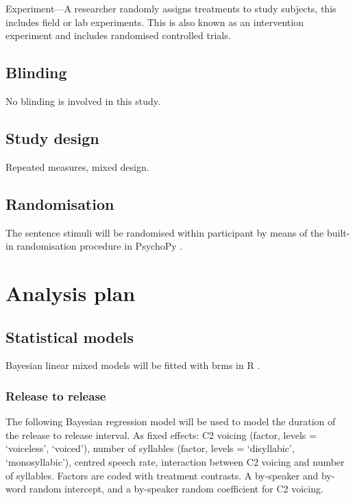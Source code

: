 \documentclass[11pt,]{article}
\begin{document}
Experiment---A researcher randomly assigns treatments to study subjects,
this includes field or lab experiments. This is also known as an
intervention experiment and includes randomised controlled trials.

\hypertarget{blinding}{%
\subsection{Blinding}\label{blinding}}

No blinding is involved in this study.

\hypertarget{study-design}{%
\subsection{Study design}\label{study-design}}

Repeated measures, mixed design.

\hypertarget{randomisation}{%
\subsection{Randomisation}\label{randomisation}}

The sentence stimuli will be randomised within participant by means of
the built-in randomisation procedure in PsychoPy \citep{peirce2009}.

\hypertarget{analysis-plan}{%
\section{Analysis plan}\label{analysis-plan}}

\hypertarget{statistical-models}{%
\subsection{Statistical models}\label{statistical-models}}

\label{s:stats}

Bayesian linear mixed models
\citep{vasishth2018, mcelreath2015, kruschke2015} will be fitted with
brms \citep{burkner2017, burkner2018} in R \citep{r-core-team2018}.

\hypertarget{release-to-release}{%
\subsubsection{Release to release}\label{release-to-release}}

The following Bayesian regression model will be used to model the
duration of the release to release interval. As fixed effects: C2
voicing (factor, levels = `voiceless', `voiced'), number of syllables
(factor, levels = `disyllabic', `monosyllabic'), centred speech rate,
interaction between C2 voicing and number of syllables. Factors are
coded with treatment contrasts. A by-speaker and by-word random
intercept, and a by-speaker random coefficient for C2 voicing.
\end{document}
